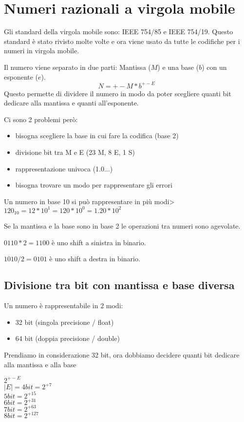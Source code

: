 \documentclass[a4paper]{article}
\theoremstyle{break}
\theoremstyle{break}
\theoremstyle{break}
\theoremstyle{break}
\begin{document}


\tableofcontents
\pagebreak

\section{Numeri razionali a virgola mobile}
Gli standard della virgola mobile sono: IEEE 754/85 e IEEE 754/19. Questo standard
è stato rivisto molte volte e ora viene usato da tutte le codifiche per i numeri in
virgola mobile.

Il numero viene separato in due parti: Mantissa (\( M \)) e una base (\(b\))
con un esponente ($e$).
\[
	N = +- M * b^{+-E}
\]
Questo permette di dividere il numero in modo da poter scegliere quanti bit dedicare
alla mantissa e quanti all'esponente.

Ci sono 2 problemi però:
\begin{itemize}
	\item bisogna scegliere la base in cui fare la codifica (base 2)
	\item divisione bit tra M e E (23 M, 8 E, 1 S)
	\item rappresentazione univoca (1.0...)
	\item bisogna trovare un modo per rappresentare gli errori
\end{itemize}

Un numero in base 10 si può rappresentare in più modi>
\(120_{10} = 12*10^{1} = 120 * 10^{0} = 1.20 * 10^{2}\)

Se la mantissa e la base sono in base 2 le operazioni tra numeri sono agevolate.

\(0110 * 2 = 1100\) è uno shift a sinistra in binario.

\(1010/2 = 0101\) è uno shift a destra in binario.

\subsection{Divisione tra bit con mantissa e base diversa}
Un numero è rappresentabile in 2 modi:
\begin{itemize}
	\item 32 bit (singola precisione / float)
	\item 64 bit (doppia precisione / double)
\end{itemize}

Prendiamo in considerazione 32 bit, ora dobbiamo decidere quanti bit dedicare alla
mantissa e alla base

$2^{+-E}$\\
$|E| = 4 bit = 2^{+7}$\\
$5 bit = 2^{+15}$\\
$6 bit = 2^{+31}$\\
$7 bit = 2^{+63}$\\
$8 bit = 2^{+127}$
\end{document}
